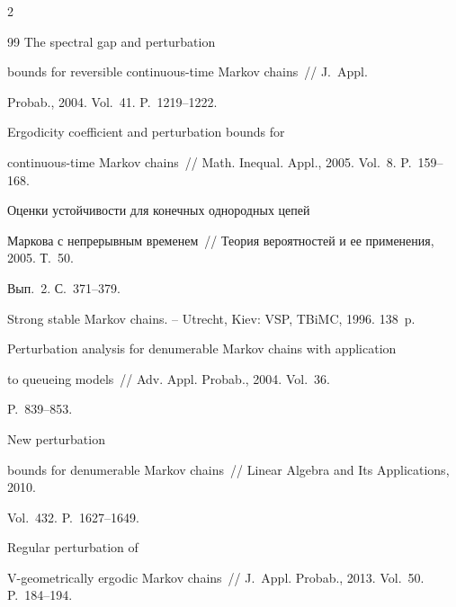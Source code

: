 \begin{multicols}{2}
{{\begin{thebibliography}{99}
  The spectral gap and perturbation

bounds for reversible continuous-time Markov chains~// J.~Appl.

Probab., 2004. Vol.~41. P.~1219--1222.




 Ergodicity coefficient and perturbation bounds for

continuous-time Markov chains~// Math. Inequal. Appl., 2005. Vol.~8. P.~159--168.




 Оценки устойчивости для конечных однородных цепей

Маркова с непрерывным временем~// Теория вероятностей и ее применения, 2005. Т.~50.

Вып.~2. С.~371--379.




  Strong stable Markov chains. -- Utrecht, Kiev: VSP, TBiMC, 1996. 138~p.





Perturbation analysis for denumerable Markov chains with application

to queueing models~// Adv. Appl. Probab., 2004. Vol.~36.

P.~839--853.




  New perturbation

bounds for denumerable Markov chains~//  Linear Algebra and Its Applications, 2010.

Vol.~432. P.~1627--1649.




 Regular perturbation of\linebreak

V-geometrically ergodic Markov chains~// J.~Appl. Probab., 2013. Vol.~50. P.~184--194.








\end{thebibliography}}}
\end{multicols}
